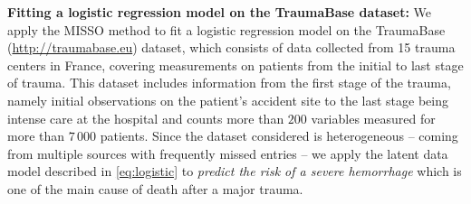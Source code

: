 \documentclass[final,12pt]{alt2022} %
\begin{document}
\eeq
\textbf{Fitting a logistic regression model on the TraumaBase dataset:}
We apply the MISSO method to fit a logistic regression model on the TraumaBase (\url{http://traumabase.eu}) dataset, which consists of data collected from 15 trauma centers in France, covering measurements on patients from the initial to last stage of trauma. 
This dataset includes information from the first stage of the trauma, namely initial observations on the patient's accident site to the last stage being intense care at the hospital and counts more than $200$ variables measured for more than $7\,000$ patients.
Since the dataset considered is heterogeneous -- coming from multiple sources with frequently missed entries -- we apply the latent data model described in  \eqref{eq:logistic} to \emph{predict the risk of a severe hemorrhage} which is one of the main cause of death after a major trauma.
\end{document}
